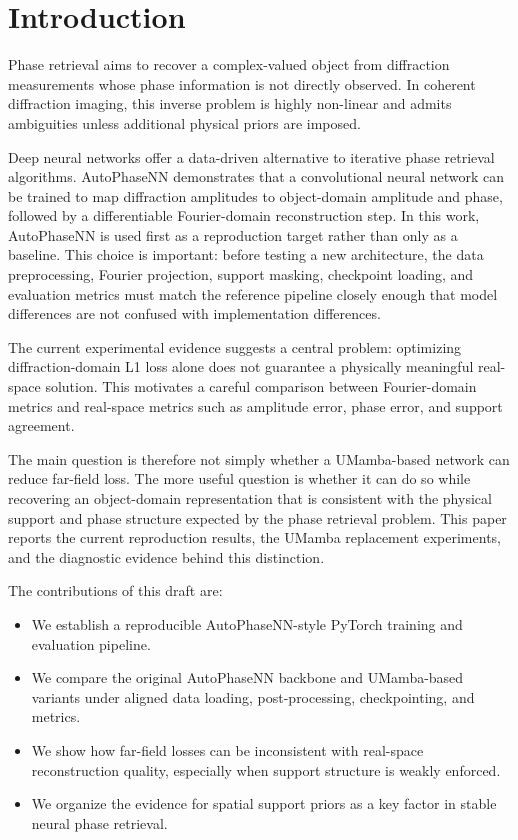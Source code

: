 \section{Introduction}

Phase retrieval aims to recover a complex-valued object from diffraction
measurements whose phase information is not directly observed. In coherent
diffraction imaging, this inverse problem is highly non-linear and admits
ambiguities unless additional physical priors are imposed.

Deep neural networks offer a data-driven alternative to iterative phase
retrieval algorithms. AutoPhaseNN demonstrates that a convolutional neural
network can be trained to map diffraction amplitudes to object-domain amplitude
and phase, followed by a differentiable Fourier-domain reconstruction step.
In this work, AutoPhaseNN is used first as a reproduction target rather than
only as a baseline. This choice is important: before testing a new architecture,
the data preprocessing, Fourier projection, support masking, checkpoint loading,
and evaluation metrics must match the reference pipeline closely enough that
model differences are not confused with implementation differences.

The current experimental evidence suggests a central problem: optimizing
diffraction-domain L1 loss alone does not guarantee a physically meaningful
real-space solution. This motivates a careful comparison between Fourier-domain
metrics and real-space metrics such as amplitude error, phase error, and support
agreement.

The main question is therefore not simply whether a UMamba-based network can
reduce far-field loss. The more useful question is whether it can do so while
recovering an object-domain representation that is consistent with the physical
support and phase structure expected by the phase retrieval problem. This paper
reports the current reproduction results, the UMamba replacement experiments,
and the diagnostic evidence behind this distinction.

The contributions of this draft are:
\begin{itemize}
  \item We establish a reproducible AutoPhaseNN-style PyTorch training and
  evaluation pipeline.
  \item We compare the original AutoPhaseNN backbone and UMamba-based variants
  under aligned data loading, post-processing, checkpointing, and metrics.
  \item We show how far-field losses can be inconsistent with real-space
  reconstruction quality, especially when support structure is weakly enforced.
  \item We organize the evidence for spatial support priors as a key factor in
  stable neural phase retrieval.
\end{itemize}
